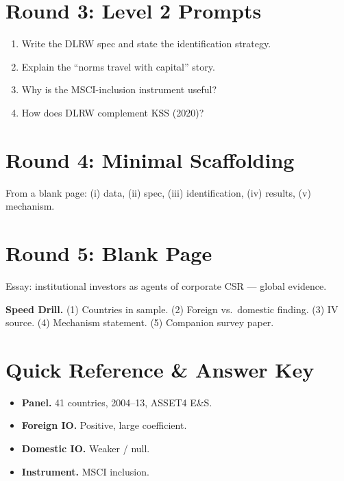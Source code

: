 \documentclass[11pt]{article}
\begin{document}
\section*{Round 3: Level 2 Prompts}
\begin{enumerate}
\item Write the DLRW spec and state the identification strategy.
\item Explain the ``norms travel with capital'' story.
\item Why is the MSCI-inclusion instrument useful?
\item How does DLRW complement KSS (2020)?
\end{enumerate}

\section*{Round 4: Minimal Scaffolding}
From a blank page: (i) data, (ii) spec, (iii) identification, (iv) results, (v) mechanism.

\section*{Round 5: Blank Page}
Essay: institutional investors as agents of corporate CSR --- global evidence.

\vspace{6pt}
\begin{drillbox}
\textbf{Speed Drill.} (1) Countries in sample. (2) Foreign vs.\ domestic finding. (3) IV source. (4) Mechanism statement. (5) Companion survey paper.
\end{drillbox}

\section*{Quick Reference \& Answer Key}
\begin{answerbox}
\begin{itemize}
\item \textbf{Panel.} 41 countries, 2004--13, ASSET4 E\&S.
\item \textbf{Foreign IO.} Positive, large coefficient.
\item \textbf{Domestic IO.} Weaker / null.
\item \textbf{Instrument.} MSCI inclusion.
\end{itemize}
\end{answerbox}
\end{document}

